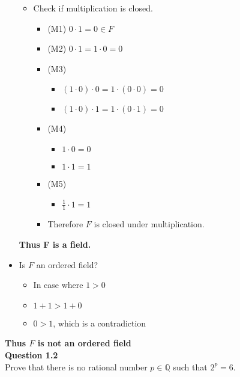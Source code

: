 \documentclass[12pt]{article}
\newcommand{\Q}{\mathbb{Q}}
\begin{document}
\begin{itemize}
\begin{itemize}
            \item Check if multiplication is closed.
                \begin{itemize}
                    \item (M1) $0 \cdot 1 = 0 \in F$
                    \item (M2) $0 \cdot 1 = 1 \cdot 0 = 0 $
                    \item (M3) 
                        \begin{itemize}
                            \item $(1\cdot 0)\cdot 0 = 1\cdot (0\cdot 0) = 0$
                            \item $(1\cdot 0)\cdot 1 = 1\cdot (0\cdot 1) = 0$
                        \end{itemize}
                    \item (M4)
                        \begin{itemize}
                            \item $1\cdot0=0$
                            \item $1\cdot1=1$
                        \end{itemize}
                    \item (M5)
                        \begin{itemize}
                            \item $\frac{1}{1}\cdot1=1$
                        \end{itemize}
                    \item Therefore $F$ is closed under multiplication.
                \end{itemize}
        \end{itemize}
    \textbf{Thus F is a field.}
    \item Is $F$ an ordered field?
        \begin{itemize}
            \item In case where $1 > 0$
            \item $1 + 1 > 1 + 0$
            \item $0 > 1$, which is a contradiction
        \end{itemize}
\end{itemize}
\textbf{Thus $F$ is not an ordered field}\\
\newline
\noindent \textbf{Question 1.2}\\ 
Prove that there is no rational number $p \in \Q$ such that $2^p = 6$.
\end{document}
